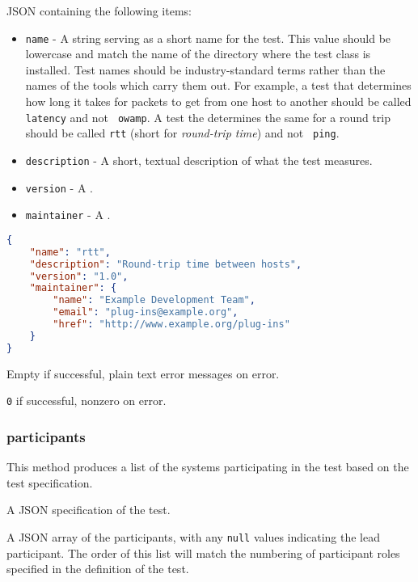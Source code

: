 \documentclass[10pt,titlepage]{article}
\begin{document}
 JSON containing the following items:
\begin{itemize}
\item{\tt name} - A string serving as a short name for the test.  This
  value should be lowercase and match the name of the directory where
  the test class is installed.  Test names should be industry-standard
  terms rather than the names of the tools which carry them out.  For
  example, a test that determines how long it takes for packets to get
  from one host to another should be called {\tt latency} and not {\tt
    owamp}.  A test the determines the same for a round trip should be
  called {\tt rtt} (short for {\it round-trip time}) and not {\tt
    ping}.
\item{\tt description} - A short, textual description of what the test
  measures.
\item{\tt version} - A .
\item{\tt maintainer} - A .
\end{itemize}

\example
\begin{lstlisting}[language=json,firstnumber=1]
{
    "name": "rtt",
    "description": "Round-trip time between hosts",
    "version": "1.0",
    "maintainer": {
        "name": "Example Development Team",
        "email": "plug-ins@example.org",
        "href": "http://www.example.org/plug-ins"
    }
}
\end{lstlisting}

 Empty if successful, plain text error
messages on error.

 {\tt 0} if successful, nonzero on error.



\subsubsection{participants}
This method produces a list of the systems participating in the test
based on the test specification.

 A JSON specification of the test.

 A JSON array of the participants, with
any {\tt null} values indicating the lead participant.  The order of
this list will match the numbering of participant roles specified in
the definition of the test.
\end{document}
